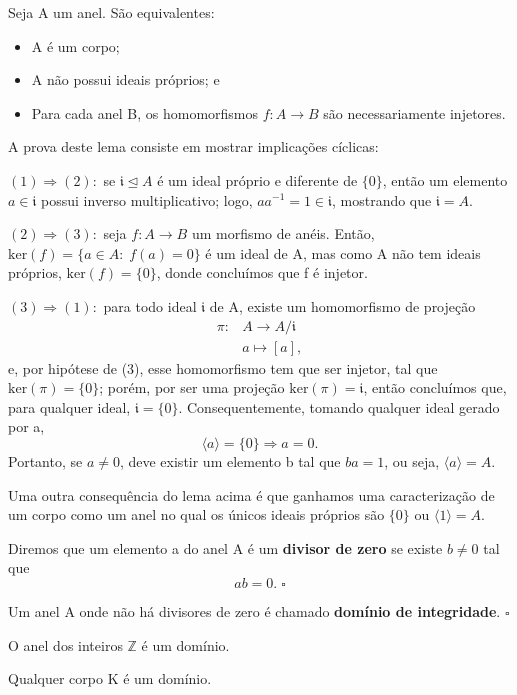 \documentclass[../algebraIII_notes.tex]{subfiles}
\begin{document}
\begin{lemma*}
	Seja A um anel. São equivalentes:
	\begin{itemize}
		\item[1)] A é um corpo;
		\item[2)] A não possui ideais próprios; e
		\item[3)] Para cada anel B, os homomorfismos \(f:A\rightarrow B\) são necessariamente injetores.
	\end{itemize}
\end{lemma*}
\begin{proof*}
	A prova deste lema consiste em mostrar implicações cíclicas:

	\((1)\Rightarrow (2):\) se \(\mathfrak{i} \trianglelefteq  A \) é um ideal próprio e diferente de \(\{0\}\), então um elemento \(a\in \mathfrak{i}\) possui inverso multiplicativo; logo, \(aa^{-1}=1\in \mathfrak{i}\), mostrando que \(\mathfrak{i}=A\).

	\((2)\Rightarrow (3):\) seja \(f:A\rightarrow B\) um morfismo de anéis. Então, \(\mathrm{ker}(f)=\{a\in A:\; f(a)=0\}\) é um ideal de A, mas como A não tem ideais próprios, \(\mathrm{ker}(f)=\{0\}\), donde concluímos que f é injetor.

	\((3)\Rightarrow (1):\) para todo ideal \(\mathfrak{i}\) de A, existe um homomorfismo de projeção
	\begin{align*}
		\pi : & A\rightarrow A/\mathfrak{i} \\
		      & a\longmapsto [a],
	\end{align*}
	e, por hipótese de (3), esse homomorfismo tem que ser injetor, tal que \(\mathrm{ker}(\pi )=\{0\}\); porém, por ser uma projeção \(\mathrm{ker}(\pi )=\mathfrak{i}\), então concluímos que, para qualquer ideal, \(\mathfrak{i}=\{0\}\).
	Consequentemente, tomando qualquer ideal gerado por a,
	\[
		\langle a \rangle=\{0\} \Rightarrow a =0.
	\]
	Portanto, se \(a\neq 0\), deve existir um elemento b tal que \(ba=1\), ou seja, \(\langle a \rangle=A.\) \qedsymbol
\end{proof*}
Uma outra consequência do lema acima é que ganhamos uma caracterização de um corpo como um anel no qual os únicos ideais próprios são \(\{0\}\) ou \(\langle 1 \rangle = A.\)
\begin{def*}
	Diremos que um elemento a do anel A é um \textbf{divisor de zero} se existe \(b\neq 0\) tal que
	\[
		ab=0.\; \square
	\]
\end{def*}
\begin{def*}
	Um anel A onde não há divisores de zero é chamado \textbf{domínio de integridade}. \(\square\)
\end{def*}
\begin{example}
	O anel dos inteiros \(\mathbb{Z}\) é um domínio.
\end{example}
\begin{example}
	Qualquer corpo K é um domínio.
\end{example}
\end{document}
